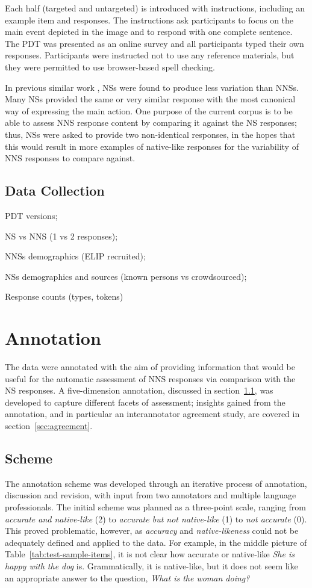 \documentclass[11pt,a4paper]{article}
\begin{document}
Each half (targeted and untargeted) is introduced with instructions, including an example item and responses. The instructions ask participants to focus on the main event depicted in the image and to respond with one complete sentence. The PDT was presented as an online survey and all participants typed their own responses. Participants were instructed not to use any reference materials, but they were permitted to use browser-based spell checking.

In previous similar work \citep{king:dickinson:13,king:dickinson:16}, NSs were found to produce less variation than NNSs. Many NSs provided the same or very similar response with the most canonical way of expressing the main action. One purpose of the current corpus is to be able to assess NNS response content by comparing it against the NS responses; thus, NSs were asked to provide two non-identical responses, in the hopes that this would result in more examples of native-like responses for the variability of NNS responses to compare against.

\subsection{Data Collection}
PDT versions;

NS vs NNS (1 vs 2 responses); 

NNSs demographics (ELIP recruited); 

NSs demographics and sources (known persons vs crowdsourced);

Response counts (types, tokens)

\section{Annotation}
The data were annotated with the aim of providing information that would be useful for the automatic assessment of NNS responses via comparison with the NS responses.  A five-dimension annotation, discussed in section~\ref{sec:scheme}, was developed to capture different facets of assessment; insights gained from the annotation, and in particular an interannotator agreement study, are covered in section~\ref{sec:agreement}.

\subsection{Scheme}
\label{sec:scheme}
The annotation scheme was developed through an iterative process of annotation, discussion and revision, with input from two annotators and multiple language professionals. The initial scheme was planned as a three-point scale, ranging from \textit{accurate and native-like} (2) to \textit{accurate but not native-like} (1) to \textit{not accurate} (0). This proved problematic, however, as \textit{accuracy} and \textit{native-likeness} could not be adequately defined and applied to the data.
For example, in the middle picture of Table~\ref{tab:test-sample-items}, it is not clear how accurate or native-like \textit{She is happy with the dog} is.  Grammatically, it is native-like, but it does not seem like an appropriate answer to the question, \textit{What is the woman doing?}
\end{document}

